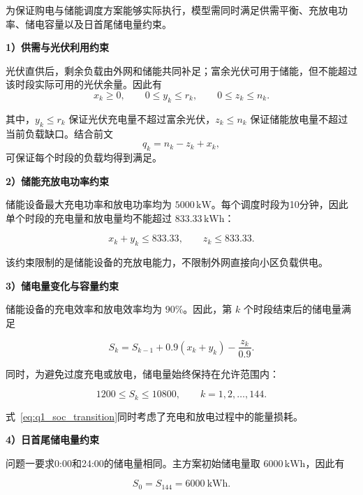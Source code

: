 为保证购电与储能调度方案能够实际执行，模型需同时满足供需平衡、充放电功率、储电容量以及日首尾储电量约束。

\textbf{1）供需与光伏利用约束}

光伏直供后，剩余负载由外网和储能共同补足；富余光伏可用于储能，但不能超过该时段实际可用的光伏余量。因此有
\begin{equation}
x_k\geq 0,\qquad
0\leq y_k\leq r_k,\qquad
0\leq z_k\leq n_k.
\label{eq:q1_supply_constraint}
\end{equation}

其中，\(y_k\leq r_k\) 保证光伏充电量不超过富余光伏，\(z_k\leq n_k\) 保证储能放电量不超过当前负载缺口。结合前文
\[
q_k=n_k-z_k+x_k,
\]
可保证每个时段的负载均得到满足。

\textbf{2）储能充放电功率约束}

储能设备最大充电功率和放电功率均为 \(5000\,\mathrm{kW}\)。每个调度时段为10分钟，因此单个时段的充电量和放电量均不能超过 \(833.33\,\mathrm{kWh}\)：

\begin{equation}
x_k+y_k\leq833.33,\qquad
z_k\leq833.33.
\label{eq:q1_power_constraint}
\end{equation}

该约束限制的是储能设备的充放电能力，不限制外网直接向小区负载供电。

\textbf{3）储电量变化与容量约束}

储能设备的充电效率和放电效率均为 \(90\%\)。因此，第 \(k\) 个时段结束后的储电量满足

\begin{equation}
S_k
=
S_{k-1}
+0.9(x_k+y_k)
-\frac{z_k}{0.9}.
\label{eq:q1_soc_transition}
\end{equation}

同时，为避免过度充电或放电，储电量始终保持在允许范围内：

\begin{equation}
1200\leq S_k\leq10800,
\qquad k=1,2,\ldots,144.
\label{eq:q1_soc_bound}
\end{equation}

式~\eqref{eq:q1_soc_transition}同时考虑了充电和放电过程中的能量损耗。

\textbf{4）日首尾储电量约束}

问题一要求0:00和24:00的储电量相同。主方案初始储电量取 \(6000\,\mathrm{kWh}\)，因此有

\begin{equation}
S_0=S_{144}=6000\ \mathrm{kWh}.
\label{eq:q1_terminal_constraint}
\end{equation}

